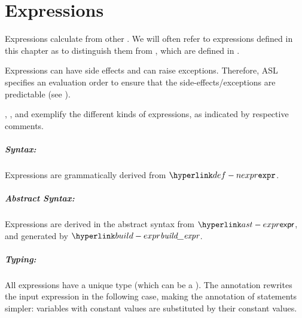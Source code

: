 
\chapter{Expressions\label{chap:Expressions}}

\hypertarget{def-rhsexpression}{}
Expressions calculate \nativevaluesterm{} from other \nativevaluesterm{}.
We will often refer to expressions defined in this chapter as \rhsexpressions{} to distinguish them
from \assignableexpressions, which are defined in .

Expressions can have side effects and can raise exceptions.
Therefore, ASL specifies an evaluation order to ensure that the side-effects/exceptions are predictable (see ).

, , and  exemplify the different kinds of expressions,
as indicated by respective comments.

\ChapterOutline

\paragraph{Syntax:} Expressions are grammatically derived from $\Nexpr$.

\paragraph{Abstract Syntax:} Expressions are derived in the abstract syntax from $\expr$,
and generated by $\buildexpr$.


\paragraph{Typing:}
All expressions have a unique type (which can be a \tupletypeterm{}).
The annotation rewrites the input expression in the following case, making the annotation of statements simpler:
variables with constant values are substituted by their constant values.

